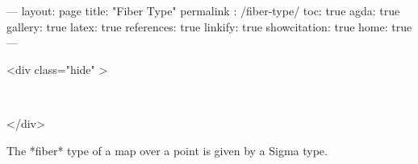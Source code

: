 ---
layout: page
title: "Fiber Type"
permalink : /fiber-type/
toc: true
agda: true
gallery: true
latex: true
references: true
linkify: true
showcitation: true
home: true
---

<div class="hide" >
\begin{code}%
\>[0]\AgdaSymbol{\{-\#}\AgdaSpace{}%
\AgdaSpace{}%
\AgdaSpace{}%
\AgdaSymbol{\#-\}}\<%
\\
\>[0]\AgdaSpace{}%
\AgdaSpace{}%
\<%
\end{code}
</div>

\begin{code}%
\>[0]\AgdaSpace{}%
\AgdaSpace{}%
\AgdaSymbol{\{}\AgdaSpace{}%
\AgdaSymbol{\}}\AgdaSpace{}%
\AgdaSymbol{\{}\AgdaSpace{}%
\AgdaSymbol{:}\AgdaSpace{}%
\AgdaSpace{}%
\AgdaSymbol{\}}\AgdaSpace{}%
\AgdaSymbol{\{}\AgdaSpace{}%
\AgdaSymbol{:}\AgdaSpace{}%
\AgdaSpace{}%
\AgdaSymbol{\}}%
\>[54]\<%
\end{code}


The *fiber* type of a map over a point is given by a Sigma type.

\begin{code}%
\>[0][@{}l@{\AgdaIndent{1}}]%
\>[2]\<%
\\
%
\>[2]\<%
\\
\>[2][@{}l@{\AgdaIndent{0}}]%
\>[4]\AgdaSymbol{:}\AgdaSpace{}%
\AgdaSymbol{(}\AgdaSpace{}%
\AgdaSymbol{:}\AgdaSpace{}%
\AgdaSpace{}%
\AgdaSpace{}%
\AgdaSymbol{)}\<%
\\
%
\>[4]\AgdaSpace{}%
\AgdaSymbol{(}\AgdaSpace{}%
\AgdaSymbol{:}\AgdaSpace{}%
\AgdaSymbol{)}\<%
\\
%
\>[4]\AgdaComment{---------------}\<%
\\
%
\>[4]\AgdaSpace{}%
\AgdaSpace{}%
\AgdaSymbol{(}\AgdaSpace{}%
\AgdaSpace{}%
\AgdaSymbol{)}\<%
\\
%
\\[\AgdaEmptyExtraSkip]%
%
\>[2]\AgdaSpace{}%
\AgdaSpace{}%
\AgdaSpace{}%
\AgdaSymbol{=}\AgdaSpace{}%
\AgdaSpace{}%
\AgdaSpace{}%
\AgdaSpace{}%
\AgdaSpace{}%
\AgdaSpace{}%
\AgdaSpace{}%
\AgdaSpace{}%
\AgdaOperator{\AgdaDatatype{==}}\AgdaSpace{}%
\AgdaSymbol{)}\<%
\end{code}

